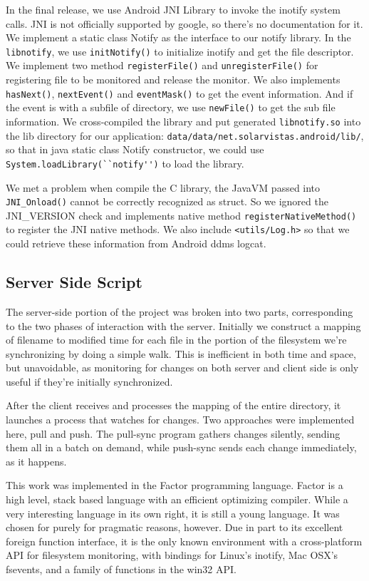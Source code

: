 In the final release, we use Android JNI Library to invoke the inotify system calls. JNI is not officially supported by 
google, so there's no documentation for it. We implement a static class Notify as the interface to our notify library. 
In the \verb+libnotify+, we use \verb+initNotify()+ to initialize inotify and get the file descriptor. We implement two 
method \verb+registerFile()+ and \verb+unregisterFile()+ for registering file to be monitored and release the monitor. 
We also implements \verb+hasNext()+, \verb+nextEvent()+ and \verb+eventMask()+ to get the event information. And if the 
event is with a subfile of directory, we use \verb+newFile()+ to get the sub file information. We cross-compiled the 
library and put generated \verb+libnotify.so+ into the lib directory for our application: 
\verb+data/data/net.solarvistas.android/lib/+, so that in java static class Notify constructor, we could use 
\verb+System.loadLibrary(``notify'')+ to load the library. 

We met a problem when compile the C library, the JavaVM passed into \verb+JNI_Onload()+ cannot be correctly recognized 
as struct. So we ignored the JNI\_VERSION check and implements native method \verb+registerNativeMethod()+ to register 
the JNI native methods. We also include \verb+<utils/Log.h>+ so that we could retrieve these information from Android 
ddms logcat.

\subsection{Server Side Script}
The server-side portion of the project was broken into two parts, corresponding to the two phases of interaction with the server. Initially we construct a mapping of filename to modified time for each file in the portion of the filesystem we're synchronizing by doing a simple walk. This is inefficient in both time and space, but unavoidable, as monitoring for changes on both server and client side is only useful if they're initially synchronized.

After the client receives and processes the mapping of the entire directory, it launches a process that watches for changes. Two approaches were implemented here, pull and push. The pull-sync program gathers changes silently, sending them all in a batch on demand, while push-sync sends each change immediately, as it happens.

This work was implemented in the Factor programming language.  Factor is a high level, stack based language with an efficient optimizing compiler.  While a very interesting language in its own right, it is still a young language.  It was chosen for \teledroid purely for pragmatic reasons, however.  Due in part to its excellent foreign function interface, it is the only known environment with a cross-platform API for filesystem monitoring, with bindings for Linux's inotify, Mac OSX's fsevents, and a family of functions in the win32 API.

